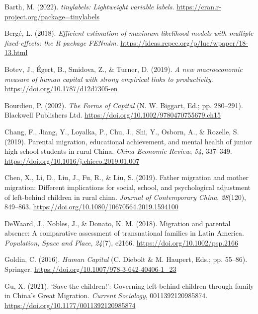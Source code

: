 \documentclass[
  man]{apa7}
\newlength{\cslhangindent}
\newlength{\cslentryspacingunit} %
\newenvironment{CSLReferences}[2] %
 {%
  \setlength{\parindent}{0pt}
  \ifodd #1
  \let\oldpar\par
  \def\par{\hangindent=\cslhangindent\oldpar}
  \fi
  \setlength{\parskip}{#2\cslentryspacingunit}
 }%
 {}
\begin{document}
\begin{CSLReferences}{1}{0}
\leavevmode{}%
Barth, M. (2022). \emph{{tinylabels}: Lightweight variable labels}. \url{https://cran.r-project.org/package=tinylabels}

\leavevmode{}%
Bergé, L. (2018). \emph{Efficient estimation of maximum likelihood models with multiple fixed-effects: the R package FENmlm}. \url{https://ideas.repec.org/p/luc/wpaper/18-13.html}

\leavevmode{}%
Botev, J., Égert, B., Smidova, Z., \& Turner, D. (2019). \emph{A new macroeconomic measure of human capital with strong empirical links to productivity}. \url{https://doi.org/10.1787/d12d7305-en}

\leavevmode{}%
Bourdieu, P. (2002). \emph{The Forms of Capital} (N. W. Biggart, Ed.; pp. 280--291). Blackwell Publishers Ltd. \url{https://doi.org/10.1002/9780470755679.ch15}

\leavevmode{}%
Chang, F., Jiang, Y., Loyalka, P., Chu, J., Shi, Y., Osborn, A., \& Rozelle, S. (2019). Parental migration, educational achievement, and mental health of junior high school students in rural China. \emph{China Economic Review}, \emph{54}, 337--349. \url{https://doi.org/10.1016/j.chieco.2019.01.007}

\leavevmode{}%
Chen, X., Li, D., Liu, J., Fu, R., \& Liu, S. (2019). Father migration and mother migration: Different implications for social, school, and psychological adjustment of left-behind children in rural china. \emph{Journal of Contemporary China}, \emph{28}(120), 849--863. \url{https://doi.org/10.1080/10670564.2019.1594100}

\leavevmode{}%
DeWaard, J., Nobles, J., \& Donato, K. M. (2018). Migration and parental absence: A comparative assessment of transnational families in Latin America. \emph{Population, Space and Place}, \emph{24}(7), e2166. \url{https://doi.org/10.1002/psp.2166}

\leavevmode{}%
Goldin, C. (2016). \emph{Human Capital} (C. Diebolt \& M. Haupert, Eds.; pp. 55--86). Springer. \url{https://doi.org/10.1007/978-3-642-40406-1_23}

\leavevmode{}%
Gu, X. (2021). {`}Save the children!{'}: Governing left-behind children through family in China{'}s Great Migration. \emph{Current Sociology}, 0011392120985874. \url{https://doi.org/10.1177/0011392120985874}


\end{CSLReferences}
\end{document}
